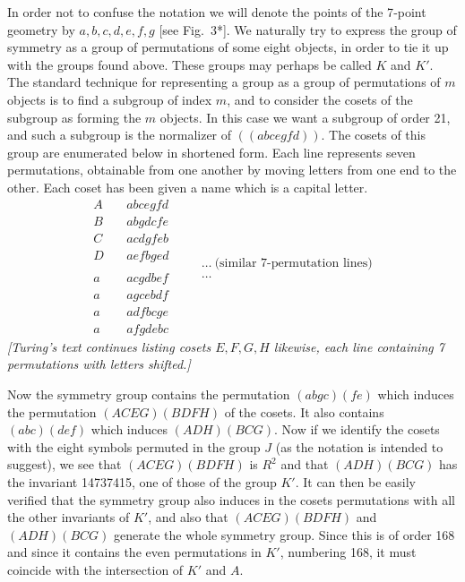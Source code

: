 \documentclass[12pt]{article}
\begin{document}
\medskip

In order not to confuse the notation we will denote the points of the 7‐point geometry by $a,b,c,d,e,f,g$ [see Fig.~3*]. We naturally try to express the group of symmetry as a group of permutations of some eight objects, in order to tie it up with the groups found above. These groups may perhaps be called $K$ and $K'$. The standard technique for representing a group as a group of permutations of $m$ objects is to find a subgroup of index $m$, and to consider the cosets of the subgroup as forming the $m$ objects. In this case we want a subgroup of order 21, and such a subgroup is the normalizer of $((abcegfd))$. The cosets of this group are enumerated below in shortened form. Each line represents seven permutations, obtainable from one another by moving letters from one end to the other. Each coset has been given a name which is a capital letter.
\[
\begin{aligned}
A&\quad abcegfd\\
B&\quad abgdcfe\\
C&\quad acdgfeb\\
D&\quad aefbged\\
\\
a&\quad acgd bef\\
a&\quad agce bdf\\
a&\quad adf bcge\\
a&\quad afgde bc
\end{aligned}
\quad
\begin{aligned}
& \dots \ \text{(similar 7‐permutation lines)}\\
& \dots 
\end{aligned}
\]
{\em [Turing’s text continues listing cosets $E, F, G, H$ likewise, each line containing 7 permutations with letters shifted.]}

\medskip

Now the symmetry group contains the permutation $(abgc)(fe)$ which induces the permutation $(ACEG)(BDFH)$ of the cosets. It also contains $(abc)(def)$ which induces $(ADH)(BCG)$. Now if we identify the cosets with the eight symbols permuted in the group $J$ (as the notation is intended to suggest), we see that $(ACEG)(BDFH)$ is $R^2$ and that $(ADH)(BCG)$ has the invariant 14737415, one of those of the group $K'$. It can then be easily verified that the symmetry group also induces in the cosets permutations with all the other invariants of $K'$, and also that $(ACEG)(BDFH)$ and $(ADH)(BCG)$ generate the whole symmetry group. Since this is of order 168 and since it contains the even permutations in $K'$, numbering 168, it must coincide with the intersection of $K'$ and $A$.
\end{document}

